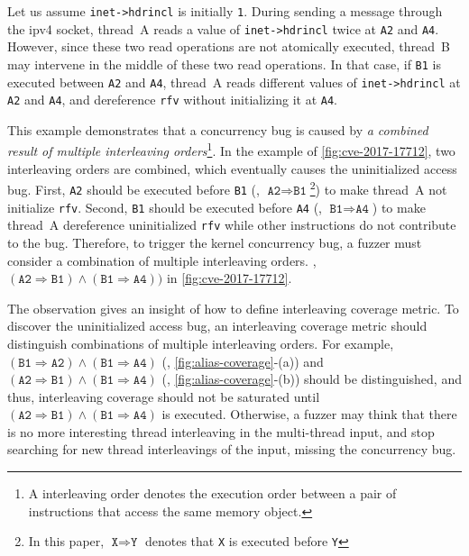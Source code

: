 Let us assume \texttt{inet->hdrincl} is initially \texttt{1}.
%
During sending a message through the ipv4 socket, thread~A reads a
value of \texttt{inet->hdrincl} twice at \texttt{A2} and \texttt{A4}.
%
However, since these two read operations are not atomically executed,
thread~B may intervene in the middle of these two read operations.
%
In that case, if \texttt{B1} is executed between \texttt{A2} and
\texttt{A4}, thread~A reads different values of \texttt{inet->hdrincl}
at \texttt{A2} and \texttt{A4}, and dereference \texttt{rfv} without
initializing it at \texttt{A4}.


%
This example demonstrates that a concurrency bug is caused by
\textit{a combined result of multiple interleaving orders}\footnote{A
  interleaving order denotes the execution order between a pair of
  instructions that access the same memory object.}.
%
In the example of \autoref{fig:cve-2017-17712}, two interleaving orders
are combined, which eventually causes the uninitialized access bug.
%
First, \texttt{A2} should be executed before \texttt{B1} (\ie,
$\texttt{A2} \Rightarrow \texttt{B1}$\footnote{In this paper,
  $\texttt{X} \Rightarrow \texttt{Y}$ denotes that \texttt{X} is
  executed before \texttt{Y}}) to make thread~A not initialize
\texttt{rfv}.
%
Second, \texttt{B1} should be executed before \texttt{A4} (\ie,
$\texttt{B1} \Rightarrow \texttt{A4}$) to make thread~A dereference
uninitialized \texttt{rfv} while other instructions do not contribute
to the bug.
%
Therefore, to trigger the kernel concurrency bug, a fuzzer must
consider a combination of multiple interleaving orders. \eg, 
$(\texttt{A2} \Rightarrow \texttt{B1}) \wedge (\texttt{B1} \Rightarrow
\texttt{A4}))$ in \autoref{fig:cve-2017-17712}.


 The observation
gives an insight of how to define interleaving coverage metric.  To
discover the uninitialized access bug, an interleaving coverage metric
should distinguish combinations of multiple interleaving orders.
%
For example,
$(\texttt{B1} \Rightarrow \texttt{A2}) \wedge (\texttt{B1} \Rightarrow
\texttt{A4})$ (\ie, \autoref{fig:alias-coverage}-(a)) and
$(\texttt{A2} \Rightarrow \texttt{B1}) \wedge (\texttt{B1} \Rightarrow
\texttt{A4})$ (\ie, \autoref{fig:alias-coverage}-(b)) should be
distinguished, and thus, interleaving coverage should not be saturated
until
$(\texttt{A2} \Rightarrow \texttt{B1}) \wedge (\texttt{B1} \Rightarrow
\texttt{A4})$ is executed.
%
Otherwise, a fuzzer may think that there is no more interesting thread
interleaving in the multi-thread input, and stop searching for new
thread interleavings of the input, missing the concurrency bug.

